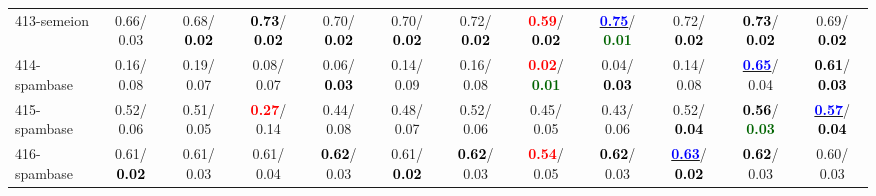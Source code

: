 \begin{table}[h]
\begin{center}
{\begin{tabular}{lc|c|c|c|c|c|c|c|c|c|c}
413-semeion &   0.66/  0.03 &   0.68/\textcolor{black}{\textbf{  0.02}} & \textcolor{black}{\textbf{  0.73}}/\textcolor{black}{\textbf{  0.02}} &   0.70/\textcolor{black}{\textbf{  0.02}} &   0.70/\textcolor{black}{\textbf{  0.02}} &   0.72/\textcolor{black}{\textbf{  0.02}} & \textcolor{red}{\textbf{  0.59}}/\textcolor{black}{\textbf{  0.02}} & \underline{\textcolor{blue}{\textbf{  0.75}}}/\textcolor{darkgreen}{\textbf{  0.01}} &   0.72/\textcolor{black}{\textbf{  0.02}} & \textcolor{black}{\textbf{  0.73}}/\textcolor{black}{\textbf{  0.02}} &   0.69/\textcolor{black}{\textbf{  0.02}} \\
414-spambase &   0.16/  0.08 &   0.19/  0.07 &   0.08/  0.07 &   0.06/\textcolor{black}{\textbf{  0.03}} &   0.14/  0.09 &   0.16/  0.08 & \textcolor{red}{\textbf{  0.02}}/\textcolor{darkgreen}{\textbf{  0.01}} &   0.04/\textcolor{black}{\textbf{  0.03}} &   0.14/  0.08 & \underline{\textcolor{blue}{\textbf{  0.65}}}/  0.04 & \textcolor{black}{\textbf{  0.61}}/\textcolor{black}{\textbf{  0.03}} \\
415-spambase &   0.52/  0.06 &   0.51/  0.05 & \textcolor{red}{\textbf{  0.27}}/  0.14 &   0.44/  0.08 &   0.48/  0.07 &   0.52/  0.06 &   0.45/  0.05 &   0.43/  0.06 &   0.52/\textcolor{black}{\textbf{  0.04}} & \textcolor{black}{\textbf{  0.56}}/\textcolor{darkgreen}{\textbf{  0.03}} & \underline{\textcolor{blue}{\textbf{  0.57}}}/\textcolor{black}{\textbf{  0.04}} \\
416-spambase &   0.61/\textcolor{black}{\textbf{  0.02}} &   0.61/  0.03 &   0.61/  0.04 & \textcolor{black}{\textbf{  0.62}}/  0.03 &   0.61/\textcolor{black}{\textbf{  0.02}} & \textcolor{black}{\textbf{  0.62}}/  0.03 & \textcolor{red}{\textbf{  0.54}}/  0.05 & \textcolor{black}{\textbf{  0.62}}/  0.03 & \underline{\textcolor{blue}{\textbf{  0.63}}}/\textcolor{black}{\textbf{  0.02}} & \textcolor{black}{\textbf{  0.62}}/  0.03 &   0.60/  0.03 \\\end{tabular}}\label{stratsALCKappa12AllReduxa}
\end{center}
\end{table}
